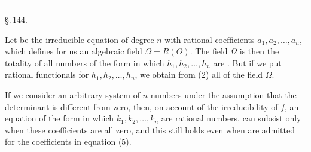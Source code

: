 
\begin{center}


\rule{4cm}{0.4pt}

\S.\,144.


\end{center}

Let
be the irreducible equation of degree $n$ with rational coefficients $a_1, a_2, \ldots, a_n$, which defines for us an algebraic field $\Omega = R(\Theta)$. The field $\Omega$ is then the totality of all numbers of the form
in which $h_1, h_2, \ldots, h_n$ are . But if we put rational functionals for $h_1, h_2, \ldots, h_n$, we obtain from (2) all  of the field $\Omega$.

If we consider an arbitrary system of $n$ numbers
under the assumption that the determinant
is different from zero, then, on account of the irreducibility of $f$, an equation of the form
in which $k_1, k_2, \ldots, k_n$ are rational numbers, can subsist only when these coefficients are all zero, and this still holds even when  are admitted for the coefficients in equation (5).
